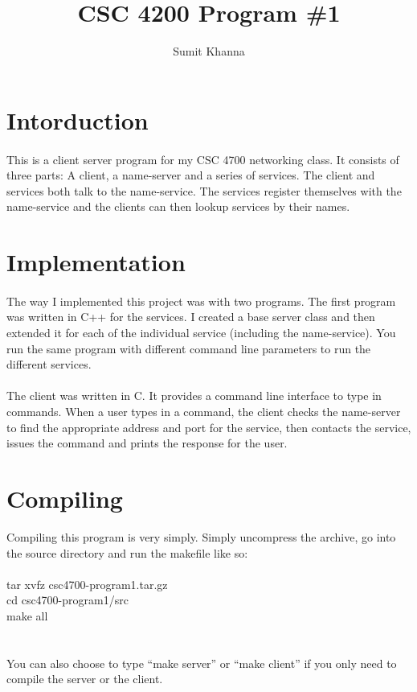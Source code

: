\documentclass[a4paper,11pt]{article}
\author{Sumit Khanna}
\title{CSC 4200 Program \#1}
\begin{document}
\maketitle
\section{Intorduction}
\paragraph{}This is a client server program for my CSC 4700 networking class. It consists of three parts: A client, a name-server and a series of services. The client and services both talk to the name-service.  The services register themselves with the name-service and the clients can then lookup services by their names.

\section{Implementation}
\paragraph{}The way I implemented this project was with two programs. The first program was written in C++ for the services. I created a base server class and then extended it for each of the individual service (including the name-service).  You run the same program with different command line parameters to run the different services.
\paragraph{}The client was written in C. It provides a command line interface to type in commands. When a user types in a command, the client checks the name-server to find the appropriate address and port for the service, then contacts the service, issues the command and prints the response for the user.

\section{Compiling}
Compiling this program is very simply. Simply uncompress the archive, go into the source directory and run the makefile like so:
\\\\
tar xvfz csc4700-program1.tar.gz\\
cd csc4700-program1/src\\
make all\\
\\\\
You can also choose to type ``make server'' or ``make client'' if you only need to compile the server or the client. 
\end{document}

